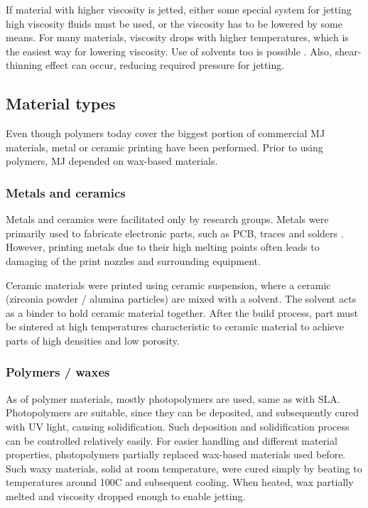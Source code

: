 \documentclass[a4paper, twoside, 11pt]{report}
\begin{document}
	If material with higher viscosity is jetted, either some special system for jetting high viscosity fluids must be used, or the viscosity has to be lowered by some means. For many materials, viscosity drops with higher temperatures, which is the easiest way for lowering viscosity. Use of solvents too is possible \cite{MJ}. Also, shear-thinning effect can occur, reducing required pressure for jetting.

\subsection{Material types}
	Even though polymers today cover the biggest portion of commercial MJ materials, metal or ceramic printing have been performed. Prior to using polymers, MJ depended on wax-based materials.

\subsubsection{Metals and ceramics}
	Metals and ceramics were facilitated only by research groups. Metals were primarily used to fabricate electronic parts, such as PCB, traces and solders \cite{MJmetals}. However, printing metals due to their high melting points often leads to damaging of the print nozzles and surrounding equipment.
	
	Ceramic materials were printed using ceramic suspension, where a ceramic (zirconia powder / alumina particles) are mixed with a solvent. The solvent acts as a binder to hold ceramic material together. After the build process, part must be sintered at high temperatures characteristic to ceramic material to achieve parts of high densities and low porosity.

\subsubsection{Polymers / waxes}
	As of polymer materials, mostly photopolymers are used, same as with SLA. Photopolymers are suitable, since they can be deposited, and subsequently cured with UV light, causing solidification. Such deposition and solidification process can be controlled relatively easily. For easier handling and different material properties, photopolymers partially replaced wax-based materials used before. Such waxy materials, solid at room temperature, were cured simply by beating to temperatures around 100C and subsequent cooling. When heated, wax partially melted and viscosity dropped enough to enable jetting.
	
\end{document}
